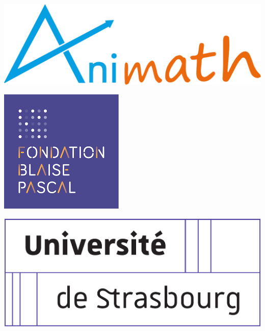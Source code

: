 {\singlespacing
\vfill
\hfill
\begin{minipage}[c]{6in}
    \hfill
    \begin{minipage}[c]{1.5in}
        \includegraphics[width=\linewidth]{logos/logo-animath-large.png}
    \end{minipage}
    \hfill
    \begin{minipage}[c]{1.5in}
        \includegraphics[width=0.6\linewidth]{logos/logo-fondation-blaise-pascal.png}
    \end{minipage}
    \hfill
    \vspace{1em}
    \vfill
    \begin{minipage}[c]{1.5in}
        \includegraphics[width=\linewidth]{logos/logo-unistra.pdf}

\end{minipage}
\end{minipage}}
